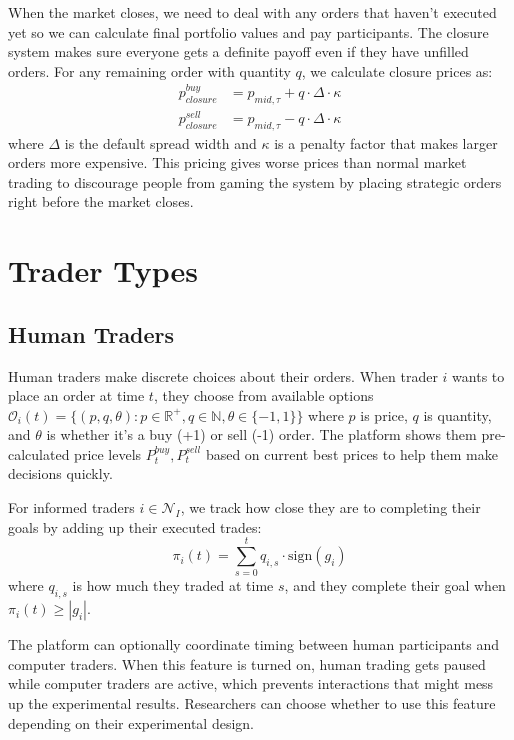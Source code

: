 When the market closes, we need to deal with any orders that haven't executed yet so we can calculate final portfolio values and pay participants. The closure system makes sure everyone gets a definite payoff even if they have unfilled orders. For any remaining order with quantity $q$, we calculate closure prices as:
\begin{align}
p_{closure}^{buy} &= p_{mid,\tau} + q \cdot \Delta \cdot \kappa \\
p_{closure}^{sell} &= p_{mid,\tau} - q \cdot \Delta \cdot \kappa
\end{align}
where $\Delta$ is the default spread width and $\kappa$ is a penalty factor that makes larger orders more expensive. This pricing gives worse prices than normal market trading to discourage people from gaming the system by placing strategic orders right before the market closes.

\section{Trader Types}

\subsection{Human Traders}

Human traders make discrete choices about their orders. When trader $i$ wants to place an order at time $t$, they choose from available options $\mathcal{O}_i(t) = \{(p, q, \theta) : p \in \mathbb{R}^+, q \in \mathbb{N}, \theta \in \{-1, 1\}\}$ where $p$ is price, $q$ is quantity, and $\theta$ is whether it's a buy (+1) or sell (-1) order. The platform shows them pre-calculated price levels $P_t^{buy}, P_t^{sell}$ based on current best prices to help them make decisions quickly.

For informed traders $i \in \mathcal{N}_I$, we track how close they are to completing their goals by adding up their executed trades:
\begin{equation}
\pi_i(t) = \sum_{s=0}^{t} q_{i,s} \cdot \text{sign}(g_i)
\end{equation}
where $q_{i,s}$ is how much they traded at time $s$, and they complete their goal when $\pi_i(t) \geq |g_i|$.

The platform can optionally coordinate timing between human participants and computer traders. When this feature is turned on, human trading gets paused while computer traders are active, which prevents interactions that might mess up the experimental results. Researchers can choose whether to use this feature depending on their experimental design.

